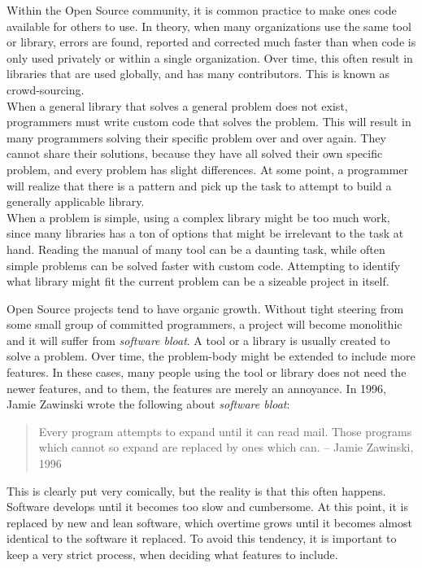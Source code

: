 \documentclass[a4paper]{article}
\begin{document}
Within the Open Source community, it is common practice to make ones code available for others to use. In theory, when many organizations use the same tool or library, errors are found, reported and corrected much faster than when code is only used privately or within a single organization. Over time, this often result in libraries that are used globally, and has many contributors. This is known as crowd-sourcing.\\

When a general library that solves a general problem does not exist, programmers must write custom code that solves the problem. This will result in many programmers solving their specific problem over and over again. They cannot share their solutions, because they have all solved their own specific problem, and every problem has slight differences. At some point, a programmer will realize that there is a pattern and pick up the task to attempt to build a generally applicable library.\\

When a problem is simple, using a complex library might be too much work, since many libraries has a ton of options that might be irrelevant to the task at hand. Reading the manual of many tool can be a daunting task, while often simple problems can be solved faster with custom code. Attempting to identify what library might fit the current problem can be a sizeable project in itself. 

Open Source projects tend to have organic growth. Without tight steering from some small group of committed programmers, a project will become monolithic and it will suffer from \textit{software bloat}. A tool or a library is usually created to solve a problem. Over time, the problem-body might be extended to include more features. In these cases, many people using the tool or library does not need the newer features, and to them, the features are merely an annoyance. In 1996, Jamie Zawinski wrote the following about \textit{software bloat}\cite{bloat}:

\begin{quotation}
  Every program attempts to expand until it can read mail. Those programs which cannot so expand are replaced by ones which can.
  -- Jamie Zawinski, 1996
\end{quotation}

This is clearly put very comically, but the reality is that this often happens. Software develops until it becomes too slow and cumbersome. At this point, it is replaced by new and lean software, which overtime grows until it becomes almost identical to the software it replaced. To avoid this tendency, it is important to keep a very strict process, when deciding what features to include.
    
\end{document}
